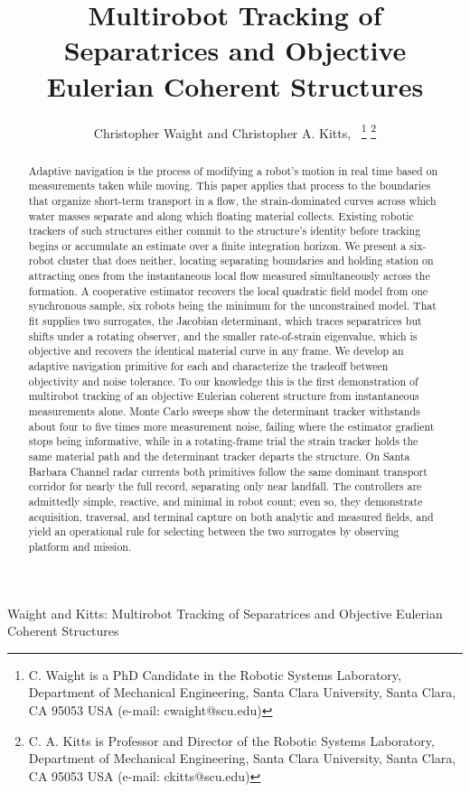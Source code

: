\documentclass[lettersize,journal]{IEEEtran}
\begin{document}
\title{Multirobot Tracking of Separatrices and
Objective Eulerian Coherent Structures}

\author{Christopher Waight and Christopher A. Kitts,~
\thanks{C. Waight is a PhD Candidate in the Robotic Systems Laboratory, Department of Mechanical Engineering, Santa Clara University, Santa Clara, CA 95053 USA (e-mail: cwaight@scu.edu)}
\thanks{C. A. Kitts is Professor and Director of the Robotic Systems Laboratory, Department of Mechanical Engineering, Santa Clara University, Santa Clara, CA 95053 USA (e-mail: ckitts@scu.edu)}
}
%
{Waight and Kitts: Multirobot Tracking of Separatrices and Objective Eulerian Coherent Structures}

\maketitle

\begin{abstract}
Adaptive navigation is the process of modifying a robot's motion in
real time based on measurements taken while moving. This paper applies
that process to the boundaries that organize short-term transport in a
flow, the strain-dominated curves across which water masses separate
and along which floating material collects. Existing robotic trackers
of such structures either commit to the structure's identity before
tracking begins or accumulate an estimate over a finite integration
horizon. We present a six-robot cluster that does neither, locating
separating boundaries and holding station on attracting ones from the
instantaneous local flow measured simultaneously across the formation.
A cooperative estimator recovers the local quadratic field model from
one synchronous sample, six robots being the minimum for the
unconstrained model. That fit supplies two surrogates, the Jacobian
determinant, which traces separatrices but shifts under a rotating
observer, and the smaller rate-of-strain eigenvalue, which is objective
and recovers the identical material curve in any frame. We develop an
adaptive navigation primitive for each and characterize the tradeoff
between objectivity and noise tolerance. To our knowledge this is the
first demonstration of multirobot tracking of an objective Eulerian
coherent structure from instantaneous measurements alone. Monte Carlo
sweeps show the determinant tracker withstands about four to five times
more measurement noise, failing where the estimator gradient stops
being informative, while in a rotating-frame trial the strain tracker
holds the same material path and the determinant tracker departs the
structure. On Santa Barbara Channel radar currents both primitives
follow the same dominant transport corridor for nearly the full record,
separating only near landfall. The controllers are admittedly simple,
reactive, and minimal in robot count; even so, they demonstrate
acquisition, traversal, and terminal capture on both analytic and
measured fields, and yield an operational rule for selecting between
the two surrogates by observing platform and mission.
\end{abstract}
\end{document}
